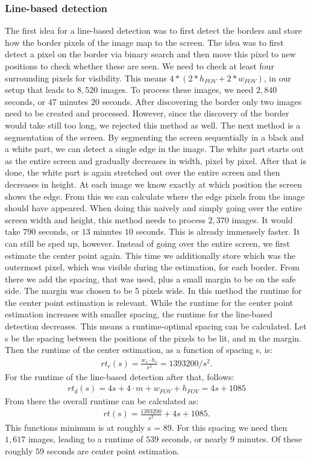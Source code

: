 \documentclass[journal,final,a4paper,twoside]{PS}
\begin{document}
\subsubsection{Line-based detection} 
\label{sec:linebased}
The first idea for a line-based detection was to first detect the borders and store how the border pixels of the image map to the screen. The idea was to first detect a pixel on the border via binary search and then move this pixel to new positions to check whether these are seen. We need to check at least four surrounding pixels for visibility. This means $4 * (2 * h_{FOV} + 2 * w_{FOV})$, in our setup that leads to $8,520$ images. To process these images, we need $2,840$ seconds, or $47$ minutes $20$ seconds. After discovering the border only two images need to be created and processed. However, since the discovery of the border would take still too long, we rejected this method as well.
The next method is a segmentation of the screen. By segmenting the screen sequentially in a black and a white part, we can detect a single edge in the image. The white part starts out as the entire screen and gradually decreases in width, pixel by pixel. After that is done, the white part is again stretched out over the entire screen and then decreases in height. At each image we know exactly at which position the screen shows the edge. From this we can calculate where the edge pixels from the image should have appeared.
When doing this naively and simply going over the entire screen width and height, this method needs to process $2,370$ images. It would take $790$ seconds, or $13$ minutes $10$ seconds. This is already immensely faster. It can still be sped up, however.
Instead of going over the entire screen, we first estimate the center point again. This time we additionally store which was the outermost pixel, which was visible during the estimation, for each border. From there we add the spacing, that was used, plus a small margin to be on the safe side. The margin was chosen to be 5 pixels wide. In this method the runtime for the center point estimation is relevant. While the runtime for the center point estimation increases with smaller spacing, the runtime for the line-based detection decreases. This means a runtime-optimal spacing can be calculated.
Let s be the spacing between the positions of the pixels to be lit, and m the margin. Then the runtime of the center estimation, as a function of spacing s, is:
\begin{align}
rt_c (s) = \frac{w_s\cdot h_s}{ s^2} = 1393200 / s^2.
\end{align}
For the runtime of the line-based detection after that, follows:
\begin{align}
rt_d (s) = 4s + 4\cdot m + w_{FOV} + h_{FOV} = 4s + 1085
\end{align}
From there the overall runtime can be calculated as:
\begin{align}
rt(s) = \frac{1393200}{s^2} + 4s +1085.
\end{align}
This functions minimum is at roughly s = 89. For this spacing we need then $1,617$ images, leading to a runtime of $539$ seconds, or nearly $9$ minutes. Of these roughly $59$ seconds are center point estimation.
\end{document}
